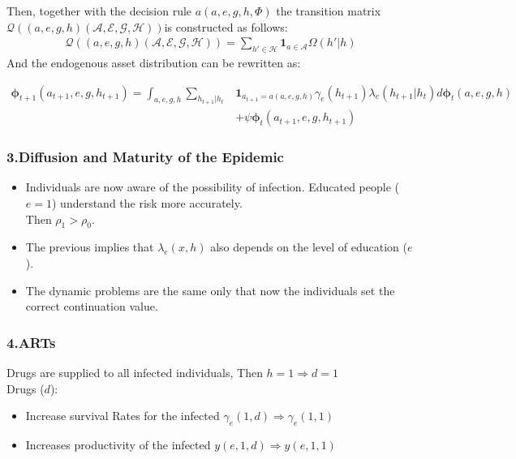 \documentclass{beamer}
\begin{document}
\begin{frame}
Then, together with the decision rule $a(a,e,g,h,\Phi)$ the transition matrix $\mathcal{Q}((a,e,g,h)(\mathcal{A,E,G,H}))$is constructed as follows:
\begin{align*}
\mathcal{Q}((a,e,g,h)(\mathcal{A,E,G,H}))=\sum_{h'\in \mathcal{H}}\textbf{1}_{a\in \mathcal{A}} \Omega(h'|h)
\end{align*} 
And the endogenous asset distribution can be rewritten as: 
\begin{footnotesize}
\begin{align*}
\boldsymbol{\phi}_{t+1}(a_{t+1},e,g,h_{t+1})=\int_{a,e,g,h}\sum_{h_{t+1}|h_{t}}&\textbf{1}_{a_{t+1}=a(a,e,g,h)}\gamma_{e}(h_{t+1})\lambda_{e}(h_{t+1}|h_{t})d \boldsymbol{\phi}_{t}(a,e,g,h) \nonumber\\
&+\psi\boldsymbol{\phi}_{t}(a_{t+1},e,g,h_{t+1})
\end{align*} 
\end{footnotesize}

\end{frame}

\begin{frame}
\frametitle{3.Diffusion and Maturity of the Epidemic}
\begin{itemize}
\item Individuals are now aware of the possibility of infection. Educated people ($e=1$) understand the risk more accurately.\\
Then $\rho_{1}>\rho_{0}$.
\item The previous implies that $\lambda_{e}(x,h)$ also depends on the level of education ($e$).
\item The dynamic problems are the same only that now the individuals set the correct continuation value. 
\end{itemize}

\end{frame}

\begin{frame}
\frametitle{4.ARTs}
Drugs are supplied to all infected individuals, Then $h=1 \Rightarrow d=1$\\
Drugs ($d$):
\begin{itemize}
\item Increase survival Rates for the infected $\gamma_{e}(1,d)\Rightarrow\gamma_{e}(1,1)$
\item Increases productivity of the infected $y(e,1,d)\Rightarrow y(e,1,1)$

\end{itemize}
\end{frame}
\end{document}
